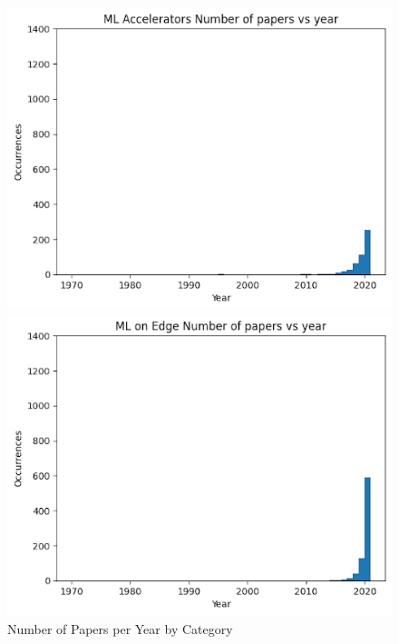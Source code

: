 \documentclass[conference]{IEEEtran}
\begin{document}
\begin{figure}[htbp]
    \centering
    \caption{Number of Papers per Year by Category}
    \parbox[b]{.5\linewidth}{
    \includegraphics[scale=0.25]{accelerators_by_year.png}
    }
    \parbox[b]{.45\linewidth}{
    \includegraphics[scale=0.25]{edge_by_year.png}
    }
    \hfill
    \parbox[b]{.5\linewidth}{
}
\end{figure}
\end{document}
